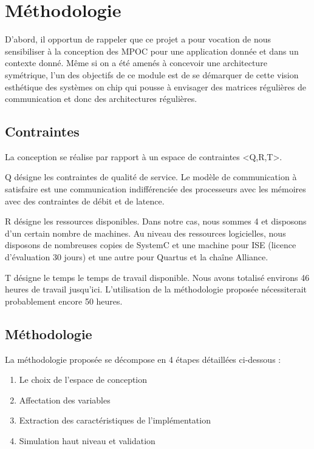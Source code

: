 \section{Méthodologie}

D'abord, il opportun de rappeler que ce projet a pour vocation de nous
sensibiliser à la conception des MPOC pour une application donnée et dans un
contexte donné. Même si on a été amenés à concevoir une architecture symétrique,
l'un des objectifs de ce module est de se démarquer de cette vision esthétique
des systèmes on chip qui pousse à envisager des matrices régulières de
communication et donc des architectures régulières.

\subsection{Contraintes}

La conception se réalise par rapport à un espace de contraintes <Q,R,T>.

Q désigne les contraintes de qualité de service. Le modèle de communication à
satisfaire est une communication indifférenciée des processeurs avec les
mémoires avec des contraintes de débit et de latence.

R désigne les ressources disponibles. Dans notre cas, nous sommes 4 et disposons
d'un certain nombre de machines. Au niveau des ressources logicielles, nous
disposons de nombreuses copies de SystemC et une machine pour ISE (licence
d'évaluation 30 jours) et une autre pour Quartus et la chaîne Alliance.

T désigne le temps le temps de travail disponible. Nous avons totalisé environs
46 heures de travail jusqu'ici. L'utilisation de la méthodologie proposée
nécessiterait probablement encore 50 heures.

\subsection{Méthodologie}

La méthodologie proposée se décompose en 4 étapes détaillées ci-dessous :
\begin{enumerate}
  \item Le choix de l'espace de conception
  \item Affectation des variables
  \item Extraction des caractéristiques de l'implémentation
  \item Simulation haut niveau et validation
\end{enumerate}

